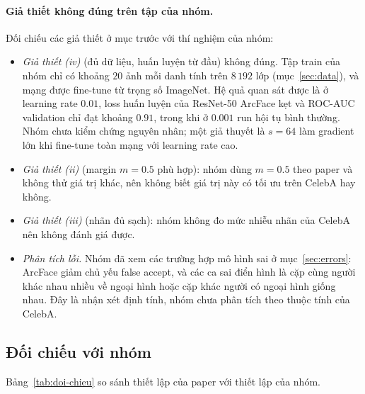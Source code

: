 \documentclass[a4paper,12pt]{article}
\begin{document}
\paragraph{Giả thiết không đúng trên tập của nhóm.} Đối chiếu các giả thiết ở mục trước với thí nghiệm của nhóm:
\begin{itemize}
    \item \emph{Giả thiết (iv)} (đủ dữ liệu, huấn luyện từ đầu) không đúng. Tập train của nhóm chỉ có khoảng $20$ ảnh mỗi danh tính trên $8\,192$ lớp (mục~\ref{sec:data}), và mạng được fine-tune từ trọng số ImageNet. Hệ quả quan sát được là ở learning rate $0.01$, loss huấn luyện của ResNet-50 ArcFace kẹt và ROC-AUC validation chỉ đạt khoảng $0.91$, trong khi ở $0.001$ run hội tụ bình thường. Nhóm chưa kiểm chứng nguyên nhân; một giả thuyết là $s = 64$ làm gradient lớn khi fine-tune toàn mạng với learning rate cao.
    \item \emph{Giả thiết (ii)} (margin $m = 0.5$ phù hợp): nhóm dùng $m = 0.5$ theo paper và không thử giá trị khác, nên không biết giá trị này có tối ưu trên CelebA hay không.
    \item \emph{Giả thiết (iii)} (nhãn đủ sạch): nhóm không đo mức nhiễu nhãn của CelebA nên không đánh giá được.
    \item \emph{Phân tích lỗi.} Nhóm đã xem các trường hợp mô hình sai ở mục~\ref{sec:errors}: ArcFace giảm chủ yếu false accept, và các ca sai điển hình là cặp cùng người khác nhau nhiều về ngoại hình hoặc cặp khác người có ngoại hình giống nhau. Đây là nhận xét định tính, nhóm chưa phân tích theo thuộc tính của CelebA.
\end{itemize}

\subsection{Đối chiếu với nhóm}\label{sec:doi-chieu}
Bảng~\ref{tab:doi-chieu} so sánh thiết lập của paper với thiết lập của nhóm.
\end{document}
